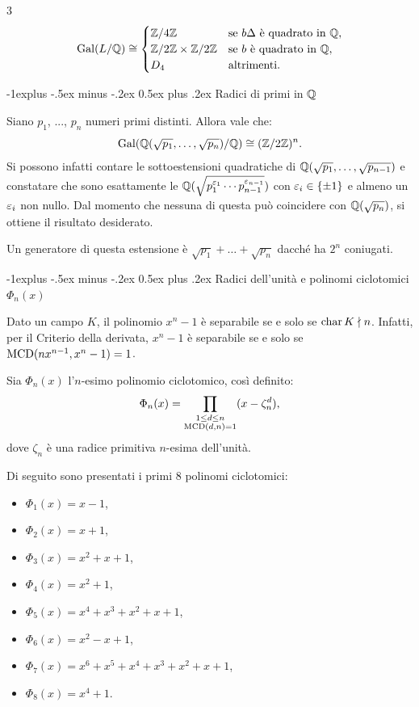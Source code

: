 \documentclass[10pt,landscape]{article}
\makeatletter
\renewcommand{\subsection}{\@startsection{subsection}{2}{0mm}%
	{-1explus -.5ex minus -.2ex}%
	{0.5ex plus .2ex}%
	{\normalfont\normalsize\bfseries}}
\makeatother
\begin{document}
\begin{multicols}{3}
	\[ \operatorname{Gal}(L / \mathbb Q) \cong \begin{cases}
			\mathbb Z /{4} \mathbb Z                  & \text{se } b \Delta \text{ è quadrato in $\mathbb Q$}, \\
			\mathbb Z /{2} \mathbb Z \times \mathbb Z /{2} \mathbb Z & \text{se } b \text{ è quadrato in $\mathbb Q$},        \\
			D_4                        & \text{altrimenti}.
		\end{cases} \]

	\subsection{Radici di primi in \texorpdfstring{$\mathbb Q$}{ℚ}}

	Siano $p_1$, ..., $p_n$ numeri primi distinti.
	Allora vale che:
	\[ \operatorname{Gal}(\mathbb Q(\sqrt{p_1}, \ldots, \sqrt{p_n})/\mathbb Q) \cong (\mathbb Z /{2} \mathbb Z)^n. \]
	Si possono infatti contare le sottoestensioni quadratiche di
	$\mathbb Q(\sqrt{p_1}, \ldots, \sqrt{p_{n-1}})$ e constatare che sono esattamente
	le $\mathbb Q(\sqrt{p_1^{\varepsilon_1} \cdots p_{n-1}^{\varepsilon_{n-1}}})$ con $\varepsilon_i \in \{\pm 1\}$
	e almeno un $\varepsilon_i$ non nullo. Dal momento che nessuna di questa può coincidere con
	$\mathbb Q(\sqrt{p_n})$, si ottiene il risultato desiderato. \smallskip

	Un generatore di questa estensione è $\sqrt{p_1} + \ldots + \sqrt{p_n}$ dacché
	ha $2^n$ coniugati.

	\subsection{Radici dell'unità e polinomi ciclotomici \texorpdfstring{$\Phi_n(x)$}{Φₙ(x)}}

	Dato un campo $K$, il polinomio $x^n - 1$ è separabile se e solo se
	$\operatorname{char} K \nmid n$. Infatti, per il Criterio della derivata, $x^n-1$
	è separabile se e solo se $\operatorname{MCD}(nx^{n-1}, x^n - 1) = 1$.

	Sia $\Phi_n(x)$ l'$n$-esimo polinomio ciclotomico, così definito:
	\[ \Phi_n(x) = \prod_{\substack{1 \leq d \leq n \\ \operatorname{MCD}(d, n) = 1}} (x - \zeta_n^d), \]
	dove $\zeta_n$ è una radice primitiva $n$-esima dell'unità. \smallskip

	Di seguito sono presentati i primi $8$ polinomi ciclotomici:
	\begin{itemize}
		\item $\Phi_1(x) = x - 1$,
		\item $\Phi_2(x) = x + 1$,
		\item $\Phi_3(x) = x^2 + x + 1$,
		\item $\Phi_4(x) = x^2 + 1$,
		\item $\Phi_5(x) = x^4 + x^3 + x^2 + x + 1$,
		\item $\Phi_6(x) = x^2 - x + 1$,
		\item $\Phi_7(x) = x^6 + x^5 + x^4 + x^3 + x^2 + x + 1$,
		\item $\Phi_8(x) = x^4 + 1$.
	\end{itemize}


\end{multicols}
\end{document}
